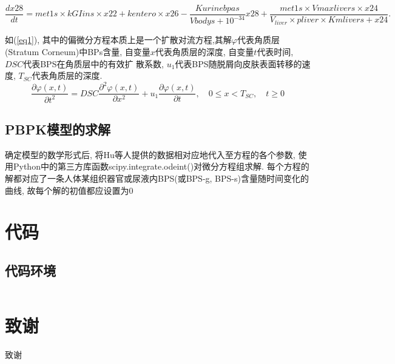 \documentclass[a4paper,punct=banjiao,twoside]{ctexrep}
\theoremstyle{plain}
\theoremstyle{definition}
\theoremstyle{remark}
\begin{document}
\begin{equation}\label{eq28}
  \frac{dx28}{dt}=met1s \times  kGIins \times  x22+kentero \times  x26-\frac{Kurinebpas}{Vbodys+10^{-34}} x28+\frac{met1s \times  Vmaxlivers \times  x24}{V_{liver}  \times  pliver \times  Kmlivers+x24}.
\end{equation}

如(\ref{eq1}), 其中的偏微分方程本质上是一个扩散对流方程,其解$\varphi$代表角质层(Stratum Corneum)中BPs含量, 自变量$x$代表角质层的深度, 自变量$t$代表时间, $DSC$代表BPS在角质层中的有效扩
散系数, $u_1$代表BPS随脱屑向皮肤表面转移的速度, $T_{SC}$代表角质层的深度.
\begin{equation}\label{eq1}
\frac{\partial \varphi(x,t) }{\partial t^2} = DSC \frac{\partial^2 \varphi(x,t)}{\partial x^2} + u_1 \frac{\partial \varphi(x,t)}{\partial t}, \quad 0\leq x <T_{SC}, \quad t\geq 0
\end{equation}



\section{PBPK模型的求解}
确定模型的数学形式后, 将Hu等人\cite{12}提供的数据相对应地代入至方程的各个参数, 使用Python中的第三方库函数scipy.integrate.odeint()对微分方程组求解. 
每个方程的解都对应了一条人体某组织器官或尿液内BPS(或BPS-g, BPS-s)含量随时间变化的曲线, 故每个解的初值都应设置为0
\clearpage
\mbox{}
\thispagestyle{empty}

\appendix
\chapter{代码}
\section{代码环境}
\begin{lstlisting}[language=PYTHON]

\end{lstlisting}

\clearpage
\mbox{}
\thispagestyle{empty}


% 



\clearpage
\mbox{}
\thispagestyle{empty}

\chapter*{致\quad 谢}
\normalsize
致谢
\end{document}
